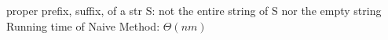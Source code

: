 proper prefix, suffix, of a str S: not the entire string of S nor the empty string
\\
Running time of Naive Method: $\Theta(nm)$\\

